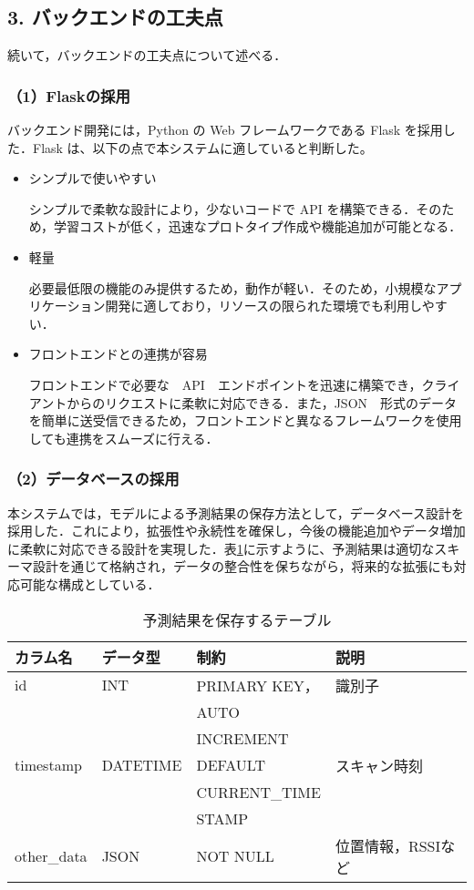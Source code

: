 \subsection*{3. バックエンドの工夫点}

続いて，バックエンドの工夫点について述べる．

\subsubsection*{（1）Flaskの採用}
バックエンド開発には，Python の Web フレームワークである Flask を採用した．Flask は、以下の点で本システムに適していると判断した。

\begin{itemize}
	\item シンプルで使いやすい
	
	シンプルで柔軟な設計により，少ないコードで API を構築できる．そのため，学習コストが低く，迅速なプロトタイプ作成や機能追加が可能となる．
	
	\item 軽量
	
	必要最低限の機能のみ提供するため，動作が軽い．そのため，小規模なアプリケーション開発に適しており，リソースの限られた環境でも利用しやすい．

	\item フロントエンドとの連携が容易
	 
	フロントエンドで必要な　API　エンドポイントを迅速に構築でき，クライアントからのリクエストに柔軟に対応できる．また，JSON　形式のデータを簡単に送受信できるため，フロントエンドと異なるフレームワークを使用しても連携をスムーズに行える．
\end{itemize}

\subsubsection*{（2）データベースの採用}
本システムでは，モデルによる予測結果の保存方法として，データベース設計を採用した．これにより，拡張性や永続性を確保し，今後の機能追加やデータ増加に柔軟に対応できる設計を実現した．表\ref{tbl:prediction_table}に示すように、予測結果は適切なスキーマ設計を通じて格納され，データの整合性を保ちながら，将来的な拡張にも対応可能な構成としている．

\begin{table}[tb]
	\centering
	\caption{予測結果を保存するテーブル}
	\label{tbl:prediction_table}
	\small
	\doublerulesep=0.3pt
	\begin{tabular}{l|l|l|l} \hline\hline\hline
		カラム名 & データ型 & 制約 & 説明 \\ \hline
		id & INT & PRIMARY KEY， &  識別子 \\
		&&AUTO& \\
		&&INCREMENT& \\ \hline
		timestamp & DATETIME & DEFAULT  & スキャン時刻 \\
		&&CURRENT\_TIME& \\
		&&STAMP& \\ \hline
		other\_data & JSON & NOT NULL & 位置情報，RSSIなど \\  \hline\hline\hline
	\end{tabular}
\end{table}

